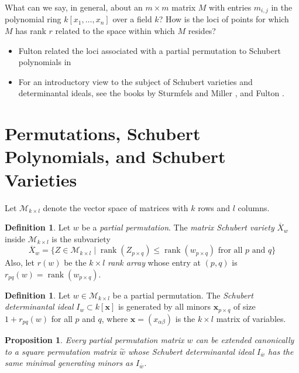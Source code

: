 \documentclass{amsart}
\newtheorem{proposition}[theorem]{Proposition}
\theoremstyle{definition}
\newtheorem{definition}[theorem]{Definition}
\theoremstyle{remark}
\DeclareMathOperator{\rank}{rank}
\numberwithin{equation}{section}
\begin{document}
What can we say, in general, about an $m \times m$ matrix $M$ with entries $m_{i,j}$ in the polynomial ring $k[x_1, \ldots, x_n]$ over a field $k$? How is the loci of points for which $M$ has rank $r$ related to the space within which $M$ resides?

\begin{itemize}
\item Fulton related the loci associated with a partial permutation to Schubert polynomials in \cite{fulton1992}
\item For an introductory view to the subject of Schubert varieties and determinantal ideals, see the books by Sturmfels and Miller \cite{miller2005combinatorial}, and Fulton \cite{fulton1998schubert}.
\end{itemize}

\section{Permutations, Schubert Polynomials, and Schubert Varieties}

Let $\mathcal{M}_{k \times l}$ denote the vector space of matrices with $k$ rows and $l$ columns.

\begin{definition}
  Let $w$ be a \emph{partial permutation}. The \emph{matrix Schubert variety} $\overline{X}_w$ inside $\mathcal{M}_{k \times l}$ is the subvariety
  \begin{equation*}
    \overline{X}_w = \{ Z \in \mathcal{M}_{k \times l} \mid \rank(Z_{p \times q}) \leq \rank(w_{p \times q}) \text{ fror all $p$ and $q$} \}
  \end{equation*}
  Also, let $r(w)$ be the $k \times l$ \emph{rank array} whose entry at $(p, q)$ is $r_{pq}(w) = \rank(w_{p \times q})$.
\end{definition}

\begin{definition}
  Let $w \in \mathcal{M}_{k \times l}$ be a partial permutation. The \emph{Schubert determinantal ideal} $I_w \subset k[\mathbf{x}]$ is generated by all minors $\mathbf{x}_{p \times q}$ of size $1 + r_{pq}(w)$ for all $p$ and $q$, where $\mathbf{x} = (x_{\alpha\beta})$ is the $k \times l$ matrix of variables.
\end{definition}

\begin{proposition}
  Every partial permutation matrix $w$ can be extended canonically to a square permutation matrix $\overset{\sim}{w}$ whose Schubert determinantal ideal $I_{\overline{w}}$ has the same minimal generating minors as $I_{\overline{w}}$.
\end{proposition}
\end{document}
